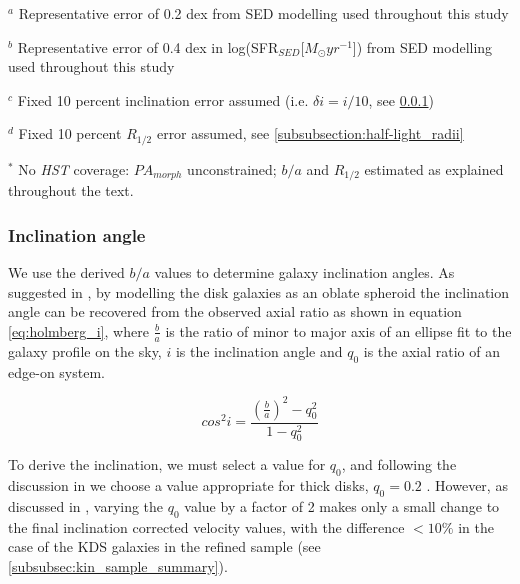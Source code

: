 \documentclass[fleqn,usenatbib]{mn2e}
\begin{document}
\begin{table*}
\begin{threeparttable}
\begin{tabular}{ccccccccccc}
\end{tabular}
\begin{tablenotes}
      \small
      \item $^{a}$ Representative error of 0.2 dex from SED modelling used throughout this study
      \item $^{b}$ Representative error of 0.4 dex in log(SFR$_{SED}$[$M_{\odot}yr^{-1}$]) from SED modelling used throughout this study
      \item $^{c}$ Fixed 10 percent inclination error assumed (i.e. $\delta i = i / 10$, see \protect\cref{subsubsection:inclination_angle})
      \item $^{d}$ Fixed 10 percent $R_{1/2}$ error assumed, see \protect\cref{subsubsection:half-light_radii}
      \item $^{*}$ No {\em HST} coverage: $PA_{morph}$ unconstrained; $b/a$ and $R_{1/2}$ estimated as explained throughout the text.
    \end{tablenotes}
  \end{threeparttable}
  \end{table*}


\subsubsection{Inclination angle}\label{subsubsection:inclination_angle}
We use the derived $b/a$ values to determine galaxy inclination angles.
As suggested in \cite{Holmberg1958}, by modelling the disk galaxies as an oblate spheroid the inclination angle can be recovered from the observed axial ratio as shown in equation \ref{eq:holmberg_i}, where $\frac{b}{a}$ is the ratio of minor to major axis of an ellipse fit to the galaxy profile on the sky, $i$ is the inclination angle and $q_{0}$ is the axial ratio of an edge-on system.

\begin{equation}\label{eq:holmberg_i}
   cos^{2}i = \frac{\left(\frac{b}{a}\right)^{2} - q_{0}^{2}}{1 - q_{0}^{2}}
\end{equation}


To derive the inclination, we must select a value for $q_{0}$, and following the discussion in \citep{Law2012a} we choose a value appropriate for thick disks, $q_{0} = 0.2$ \citep[e.g.][]{Epinat2012,Harrison2017}.
However, as discussed in \cite{Harrison2017}, varying the $q_{0}$ value by a factor of 2 makes only a small change to the final inclination corrected velocity values, with the difference $<10\%$ in the case of the KDS galaxies in the refined sample (see \cref{subsubsec:kin_sample_summary}).
\end{document}
